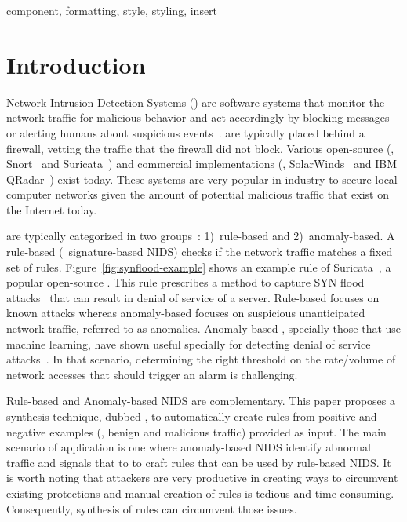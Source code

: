 \documentclass[conference]{IEEEtran}
\begin{document}
\begin{IEEEkeywords}
component, formatting, style, styling, insert
\end{IEEEkeywords}

\section{Introduction}

Network Intrusion Detection Systems (\nids{}) are software systems
that monitor the network traffic for malicious behavior and act
accordingly by blocking messages or alerting humans about suspicious
events~\cite{Mitchell:2014:SID:2597757.2542049}. \nids{} are typically
placed behind a firewall, vetting the traffic that the firewall did
not block. Various open-source (\eg{}, Snort~\cite{snort} and
Suricata~\cite{suricata}) and commercial implementations (\eg{},
SolarWinds~\cite{solarwinds} and IBM QRadar~\cite{qradar}) exist
today. These systems are very popular in industry to secure local
computer networks given the amount of potential malicious traffic that
exist on the Internet today.


\sloppy \nids{} are typically categorized in two
groups~\cite{kumar2007survey}: 1)~rule-based and 2)~anomaly-based. A
rule-based \nids{} (\aka\ signature-based NIDS) checks if the network
traffic matches a fixed set of
rules. Figure~\ref{fig:synflood-example} shows an example rule of
Suricata~\cite{suricata}, a popular open-source \nids{}. This rule
prescribes a method to capture SYN flood
attacks~\cite{Douligeris:2004:DAD:987153.987158} that can result in
denial of service of a server. Rule-based \nids{} focuses on known
attacks whereas anomaly-based \nids{} focuses on suspicious
unanticipated network traffic, referred to as anomalies. Anomaly-based
\nids{}, specially those that use machine learning, have shown useful
specially for detecting denial of service
attacks~\cite{cordy-etal-issta19}. In that scenario, determining the right
threshold on the rate/volume of network accesses that should trigger
an alarm is challenging.

Rule-based and Anomaly-based NIDS are complementary. This paper
proposes a synthesis technique, dubbed \tname{}, to automatically
create rules from positive and negative examples (\ie{}, benign and
malicious traffic) provided as input. The main scenario of application
is one where anomaly-based NIDS identify abnormal traffic and signals
that to \tname{} to craft rules that can be used by rule-based
NIDS. It is worth noting that attackers are very productive in
creating ways to circumvent existing protections and manual creation
of rules is tedious and time-consuming.
Consequently, synthesis of rules can circumvent those issues.
\end{document}
